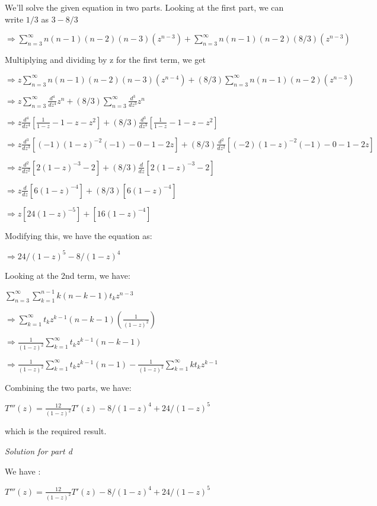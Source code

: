 \documentclass[11pt]{article}
\begin{document}
We'll solve the given equation in two parts. Looking at the first part, we can write $1/3$ as $3 - 8/3$

$\Longrightarrow \sum_{n=3}^{\infty} n(n-1)(n-2)(n-3)(z^{n-3}) + \sum_{n=3}^{\infty} n(n-1)(n-2)(8/3)(z^{n-3})$

Multiplying and dividing by z for the first term, we get

$\Longrightarrow z\sum_{n=3}^{\infty} n(n-1)(n-2)(n-3)(z^{n-4}) + (8/3)\sum_{n=3}^{\infty} n(n-1)(n-2)(z^{n-3})$

$\Longrightarrow z\sum_{n=3}^{\infty} {\frac{d^4}{dz^4} z^n} + (8/3)\sum_{n=3}^{\infty} {\frac{d^3}{dz^3} z^n}$

$\Longrightarrow z\frac{d^4}{dz^4}[{\frac{1}{1-z}}-{1-z-z^2}] +(8/3)\frac{d^3}{dz^3}[{\frac{1}{1-z}}-{1-z-z^2}]$

$\Longrightarrow z\frac{d^3}{dz^3}[(-1)(1-z)^{-2}(-1)-{0-1-2z}] +(8/3)\frac{d^2}{dz^2}[(-2)(1-z)^{-2}(-1)-{0-1-2z}]$

$\Longrightarrow z\frac{d^2}{dz^2}[2(1-z)^{-3}-2] +(8/3)\frac{d}{dz}[2(1-z)^{-3}-2]$ 

$\Longrightarrow z\frac{d}{dz}[6(1-z)^{-4}] +(8/3)[6(1-z)^{-4}]$

$\Longrightarrow z[24(1-z)^{-5}] +[16(1-z)^{-4}]$

Modifying this, we have the equation as: 

$\Longrightarrow 24/(1-z)^5 - 8/(1-z)^4$

Looking at the 2nd term, we have:

$\sum_{n=3}^{\infty} \sum_{k=1}^{n-1} k(n-k-1)t_kz^{n-3}$

$\Longrightarrow \sum_{k=1}^{\infty} t_kz^{k-1}(n-k-1)(\frac{1}{(1-z)^{2}})$ 

$\Longrightarrow \frac{1}{(1-z)^2}\sum_{k=1}^{\infty} t_kz^{k-1}(n-k-1)$

$\Longrightarrow \frac{1}{(1-z)^2} \sum_{k=1}^{\infty} t_kz^{k-1}(n-1) - \frac{1}{(1-z)^2}\sum_{k=1}^{\infty} kt_kz^{k-1}$

Combining the two parts, we have:

$T'''(z) = \frac{12}{(1-z)^2} T'(z) - 8/(1-z)^4 + 24/(1-z)^5$

which is the required result.

\medskip
\medskip

\textit{Solution for part d}

We have :

$T'''(z) = \frac{12}{(1-z)^2} T'(z) - 8/(1-z)^4 + 24/(1-z)^5$
\end{document}
